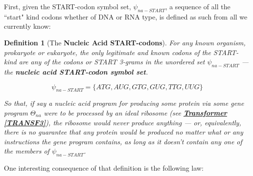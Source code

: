 \documentclass[a4paper, 18pt]{book} %
\newtheorem{defn}{Definition}
\begin{document}
First, given the START-codon symbol set, $\psi_{na-START}$, a sequence of all the ``start" kind codons whether of DNA or RNA type, is defined as such from all we currently know:

\vspace{1em}

\begin{defn}[The \textbf{Nucleic Acid START-codons}]
\label{DEFSTARTCOD}
For any known organism, prokaryote or eukaryote, the only legitimate and known codons of the START-kind are any of the codons or START 3-grams in the unordered set $\psi_{na-START}$ --- the \textbf{nucleic acid START-codon symbol set}.

\vspace{1em}

\begin{equation}
\label{EQNNASSS}
\psi_{na-START} = \{ATG,AUG,GTG,GUG,TTG,UUG\}
\end{equation}

\vspace{1em}

    So that, if say a nucleic acid program for producing some protein via some gene program $\Theta_{na}$ were to be processed by an ideal ribosome (see \textbf{\hyperref[TRANSF3]{Transformer \ref{TRANSF3}}}), the ribosome would never produce anything --- or, equivalently, there is no guarantee that any protein would be produced no matter what or any instructions the gene program contains, as long as it doesn't contain any one of the members of $\psi_{na-START}$.
\end{defn} 

\vspace{1em}

One interesting consequence of that definition is the following law:\\
\end{document}
